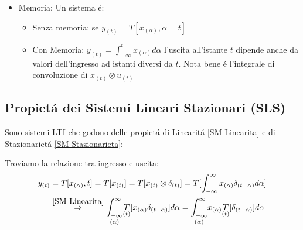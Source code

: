 \begin{itemize}
            \item {Memoria:
                Un sistema é:
                \begin{itemize}
                    \item {Senza memoria: se $y_{(t)} = T[x_{(\alpha)},\alpha=t]$}
                    \item {Con Memoria: $y_{(t)} =\int_{-\infty}^{t}x_{(\alpha)} d\alpha$ l'uscita all'istante $t$ dipende anche da valori dell'ingresso 
                          ad istanti diversi da $t$. Nota bene é l'integrale di convoluzione di $x_{(t)} \otimes u_{(t)}$ 
                    }
                \end{itemize}
            }\label{SM Memoria}
        \end{itemize}
    \subsection{Propietá dei Sistemi Lineari Stazionari (SLS)}
        Sono sistemi LTI che godono delle propietá di Linearitá \ref{SM Linearita} e di Stazionarietá \ref*{SM Stazionarieta}:
        \begin{figure}[H]
            \centering 
        \label{Def SLS}
        \end{figure}  
        Troviamo la relazione tra ingresso e uscita:
        \begin{align}
            y_{(t)} &= T[x_{(\alpha)},t] =T[x_{(t)}] = T[x_{(t)} \otimes \delta_{(t)}] = T[\int_{-\infty}^{\infty}x_{(\alpha)}\delta_{(t-\alpha)}d\alpha]\nonumber \\        
                    &\overset{\ref*{SM Linearita}}{\Rightarrow} \underset{(\alpha)}{\int_{-\infty}^{\infty}}\underset{(t)}{T}[x_{(\alpha)}\delta_{(t-\alpha)}]d\alpha =\underset{(\alpha)}{\int_{-\infty}^{\infty}}x_{(\alpha)}\underset{(t)}{T}[\delta_{(t-\alpha)}]d\alpha\nonumber         
        \end{align}  
